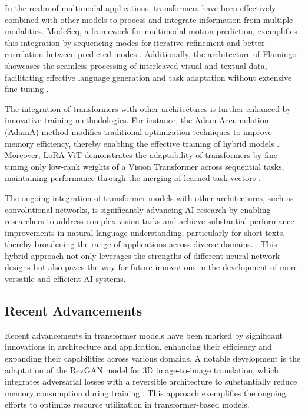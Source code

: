 In the realm of multimodal applications, transformers have been effectively combined with other models to process and integrate information from multiple modalities. ModeSeq, a framework for multimodal motion prediction, exemplifies this integration by sequencing modes for iterative refinement and better correlation between predicted modes \cite{zhou2023leveragingtcntransformereffective}. Additionally, the architecture of Flamingo showcases the seamless processing of interleaved visual and textual data, facilitating effective language generation and task adaptation without extensive fine-tuning \cite{alayrac2022flamingo}.



The integration of transformers with other architectures is further enhanced by innovative training methodologies. For instance, the Adam Accumulation (AdamA) method modifies traditional optimization techniques to improve memory efficiency, thereby enabling the effective training of hybrid models \cite{zhang2023adamaccumulationreducememory}. Moreover, LoRA-ViT demonstrates the adaptability of transformers by fine-tuning only low-rank weights of a Vision Transformer across sequential tasks, maintaining performance through the merging of learned task vectors \cite{chitale2023taskarithmeticloracontinual}.



The ongoing integration of transformer models with other architectures, such as convolutional networks, is significantly advancing AI research by enabling researchers to address complex vision tasks and achieve substantial performance improvements in natural language understanding, particularly for short texts, thereby broadening the range of applications across diverse domains. \cite{ginzburg2021selfsuperviseddocumentsimilarityranking,timagetran4}. This hybrid approach not only leverages the strengths of different neural network designs but also paves the way for future innovations in the development of more versatile and efficient AI systems.



\subsection{Recent Advancements} \label{subsec:Recent Advancements}

Recent advancements in transformer models have been marked by significant innovations in architecture and application, enhancing their efficiency and expanding their capabilities across various domains. A notable development is the adaptation of the RevGAN model for 3D image-to-image translation, which integrates adversarial losses with a reversible architecture to substantially reduce memory consumption during training \cite{vanderouderaa2019chestctsuperresolutiondomainadaptation}. This approach exemplifies the ongoing efforts to optimize resource utilization in transformer-based models.



